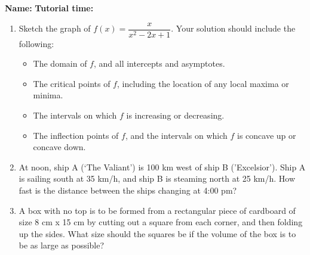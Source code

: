 \documentclass[12pt]{article}
\begin{document}
{\bf \large Name:} \hspace{2.5in} {\bf Tutorial time:}

\bigskip

\bigskip

\thispagestyle{fancy}

 \begin{enumerate}
  \item Sketch the graph of $f(x) = \dfrac{x}{x^2-2x+1}$. Your solution should include the following:
\begin{itemize}
 \item The domain of $f$, and all intercepts and asymptotes.
 \item The critical points of $f$, including the location of any local maxima or minima.
 \item The intervals on which $f$ is increasing or decreasing.
 \item The inflection points of $f$, and the intervals on which $f$ is concave up or concave down.
\end{itemize}
\newpage

\item At noon, ship A (`The Valiant') is 100 km west of ship B ('Excelsior'). Ship A is sailing south at 35 km/h, and ship B is steaming north at 25 km/h. How fast is the distance between the ships changing at 4:00 pm?

\vspace{4in}

\item A box with no top is to be formed from a rectangular piece of cardboard of size 8 cm x 15 cm by cutting out a square from each corner, and then folding up the sides. What size should the squares be if the volume of the box is to be as large as possible?
\end{enumerate}
\end{document}
